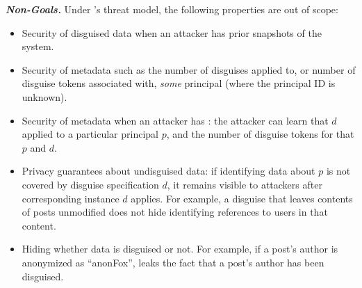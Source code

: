 \vspace{6pt}\noindent\textbf{\emph{Non-Goals.}}
%
Under \sys's threat model, the following properties are out of scope:
%
\begin{itemize}
    \item Security of disguised data when an attacker has prior snapshots of the system.
    \item Security of metadata such as the number of disguises applied to, or number of
        disguise tokens associated with, \emph{some} principal (where the principal
        ID is unknown).
    \item Security of metadata when an attacker has : the attacker can learn that $d$
        applied to a particular principal $p$, and the number of disguise tokens for that $p$ and $d$.
    \item Privacy guarantees about undisguised data: if identifying data about $p$ is not covered by
        disguise specification $d$, it remains visible to attackers after corresponding instance $d$ applies.
        For example, a disguise that leaves contents of posts unmodified does not hide identifying references
	to users in that content.
    \item Hiding whether data is disguised or not. For example, if a post's author is anonymized as ``anonFox'',
        \sys leaks the fact that a post's author has been disguised.
\end{itemize}
